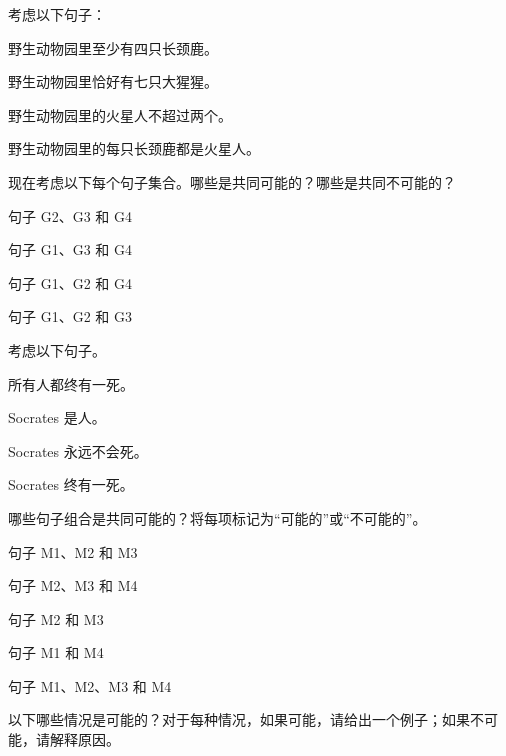 \noindent \problempart 考虑以下句子：


\begin{compactlist}%
\item[G1.] \label{itm:at_least_four}野生动物园里至少有四只长颈鹿。
\item[G2.] \label{itm:exactly_seven} 野生动物园里恰好有七只大猩猩。
\item[G3.] \label{itm:not_more_than_two} 野生动物园里的火星人不超过两个。
\item[G4.] \label{itm:martians} 野生动物园里的每只长颈鹿都是火星人。
\end{compactlist}

现在考虑以下每个句子集合。哪些是共同可能的？哪些是共同不可能的？


\begin{compactlist}
\item 句子 G2、G3 和 G4
\item 句子 G1、G3 和 G4
\item 句子 G1、G2 和 G4
\item 句子 G1、G2 和 G3
\end{compactlist}

\problempart 考虑以下句子。


\begin{compactlist}%
\item[M1.] \label{itm:allmortal} 所有人都终有一死。
\item[M2.] \label{itm:socperson} Socrates 是人。
\item[M3.] \label{itm:socnotdie} Socrates 永远不会死。
\item[M4.] \label{itm:socmortal} Socrates 终有一死。
\end{compactlist}


哪些句子组合是共同可能的？将每项标记为“可能的”或“不可能的”。


\begin{compactlist}
\item 句子 M1、M2 和 M3
\item 句子 M2、M3 和 M4
\item 句子 M2 和 M3
\item 句子 M1 和 M4
\item 句子 M1、M2、M3 和 M4
\end{compactlist}

\problempart
\label{pr.EnglishCombinations2}
以下哪些情况是可能的？对于每种情况，如果可能，请给出一个例子；如果不可能，请解释原因。


